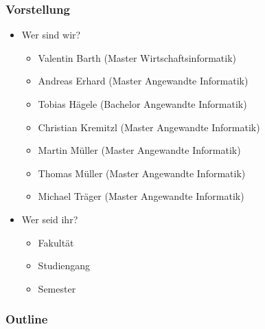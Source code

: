\documentclass[10pt,
\lang ,
\handoutmode ,
compress
]{beamer}
\begin{document}
  {
  	\frametitle{Vorstellung}
     \begin{itemize}
 	    \item Wer sind wir?
 	    \begin{itemize}
	 	    \item Valentin Barth (Master Wirtschaftsinformatik)
	 	    \item Andreas Erhard (Master Angewandte Informatik)
	 	    \item Tobias Hägele (Bachelor Angewandte Informatik)
	 	    \item Christian Kremitzl (Master Angewandte Informatik)
	 	    \item Martin Müller (Master Angewandte Informatik)
	 	    \item Thomas Müller (Master Angewandte Informatik)
	 	    \item Michael Träger (Master Angewandte Informatik)
 	    \end{itemize}
 	    \medskip
 	    \item Wer seid ihr?
 	    \begin{itemize}
	 	    \item Fakultät
	 	    \item Studiengang
	 	    \item Semester
 	    \end{itemize}
     \end{itemize}
  }

\begin{frame}{\contentsname}
    \frametitle{Outline}
\begin{multicols}{2}
\tableofcontents[hideallsubsections]
\end{multicols}
\end{frame}


%

















%



%
%
\end{document}
